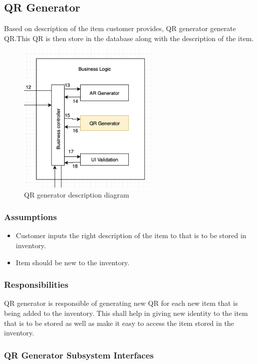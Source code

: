 \subsection{QR Generator}
Based on description of the item customer provides, QR generator generate QR.This QR is then store in the database along with the  description of the item.

\begin{figure}[h!]
	\centering
 	\includegraphics[width=0.60\textwidth]{images/qrgenerator}
 \caption{QR generator description diagram}
\end{figure}

\subsubsection{Assumptions}
\begin{itemize}
    \item Customer inputs the right description of the item to  that is to be stored in inventory.
    \item Item should be new to the inventory.
    
\end{itemize}

\subsubsection{Responsibilities}
QR generator is responsible of generating new QR for each new item that is being added to the inventory. This shall help in giving new identity to the item that is to be stored as well as make it easy to access the item stored in the inventory.

\subsubsection{QR Generator Subsystem Interfaces}

